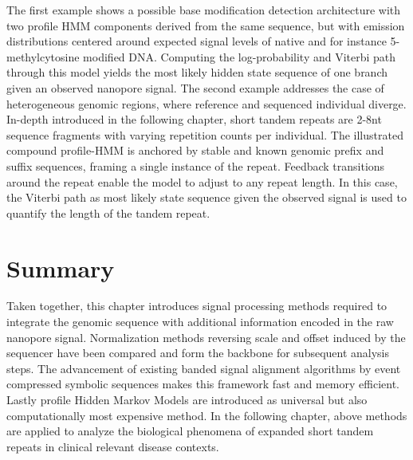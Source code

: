 The first example shows a possible base modification detection architecture with two profile HMM components derived from the same sequence, but with emission distributions centered around expected signal levels of native and for instance 5-methylcytosine modified DNA. Computing the log-probability and Viterbi path through this model yields the most likely hidden state sequence of one branch given an observed nanopore signal.
The second example addresses the case of heterogeneous genomic regions, where reference and sequenced individual diverge. In-depth introduced in the following chapter, short tandem repeats are 2-8nt sequence fragments with varying repetition counts per individual. The illustrated compound profile-HMM is anchored by stable and known genomic prefix and suffix sequences, framing a single instance of the repeat. Feedback transitions around the repeat enable the model to adjust to any repeat length. In this case, the Viterbi path as most likely state sequence given the observed signal is used to quantify the length of the tandem repeat.




\section{Summary}
\label{sec:signal:summary}

Taken together, this chapter introduces signal processing methods required to integrate the genomic sequence with additional information encoded in the raw nanopore signal. Normalization methods reversing scale and offset induced by the sequencer have been compared and form the backbone for subsequent analysis steps. The advancement of existing banded signal alignment algorithms by event compressed symbolic sequences makes this framework fast and memory efficient. Lastly profile Hidden Markov Models are introduced as universal but also computationally most expensive method. In the following chapter, above methods are applied to analyze the biological phenomena of expanded short tandem repeats in clinical relevant disease contexts.






